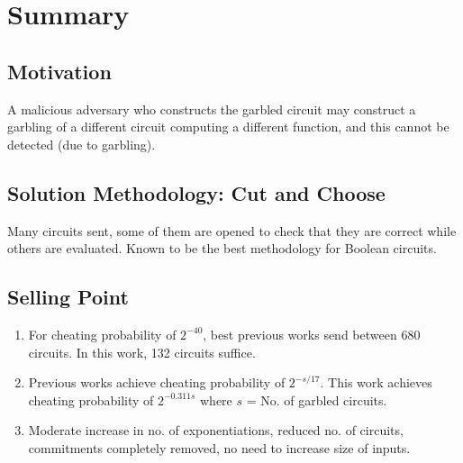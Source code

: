
\clearpage
{}

%
\setcounter{section}{0} %

\section{Summary}

\subsection{Motivation}
A malicious adversary who constructs the garbled circuit may construct a garbling of a different circuit computing a different function, and this cannot be detected (due to garbling).

\subsection{Solution Methodology: Cut and Choose}
Many circuits sent, some of them are opened to check that they are correct while others are evaluated. Known to be the best methodology for Boolean circuits.

\subsection{Selling Point}
\begin{enumerate}
    \item For cheating probability of $2^{-40}$, best previous works send between 680 circuits. In this work, 132 circuits suffice.
    \item Previous works achieve cheating probability of $2^{-s/17}$. This work achieves cheating probability of $2^{-0.311s}$ where $s$ = No. of garbled circuits.
    \item Moderate increase in no. of exponentiations, reduced no. of circuits, commitments completely removed, no need to increase size of inputs.
\end{enumerate}

